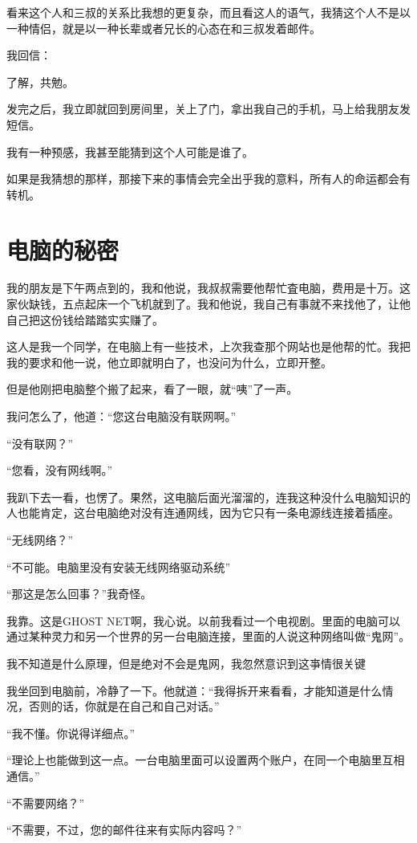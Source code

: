 看来这个人和三叔的关系比我想的更复杂，而且看这人的语气，我猜这个人不是以一种情侣，就是以一种长辈或者兄长的心态在和三叔发着邮件。

我回信：

了解，共勉。

发完之后，我立即就回到房间里，关上了门，拿出我自己的手机，马上给我朋友发短信。

我有一种预感，我甚至能猜到这个人可能是谁了。

如果是我猜想的那样，那接下来的事情会完全出乎我的意料，所有人的命运都会有转机。

\chapter{电脑的秘密}

我的朋友是下午两点到的，我和他说，我叔叔需要他帮忙査电脑，费用是十万。这家伙缺钱，五点起床一个飞机就到了。我和他说，我自己有事就不来找他了，让他自己把这份钱给踏踏实实赚了。

这人是我一个同学，在电脑上有一些技术，上次我查那个网站也是他帮的忙。我把我的要求和他一说，他立即就明白了，也没问为什么，立即开整。

但是他刚把电脑整个搬了起来，看了一眼，就“咦”了一声。

我问怎么了，他道：“您这台电脑没有联网啊。”

“没有联网？”

“您看，没有网线啊。”

我趴下去一看，也愣了。果然，这电脑后面光溜溜的，连我这种没什么电脑知识的人也能肯定，这台电脑绝对没有连通网线，因为它只有一条电源线连接着插座。

“无线网络？”

“不可能。电脑里没有安装无线网络驱动系统”

“那这是怎么回事？”我奇怪。

我靠。这是GHOST NET啊，我心说。以前我看过一个电视剧。里面的电脑可以通过某种灵力和另一个世界的另一台电脑连接，里面的人说这种网络叫做“鬼网”。

我不知道是什么原理，但是绝对不会是鬼网，我忽然意识到这亊情很关键

我坐回到电脑前，冷静了一下。他就道：“我得拆开来看看，才能知道是什么情况，否则的话，你就是在自己和自己对话。”

“我不懂。你说得详细点。”

“理论上也能做到这一点。一台电脑里面可以设置两个账户，在同一个电脑里互相通信。”

“不需要网络？”

“不需要，不过，您的邮件往来有实际内容吗？”

